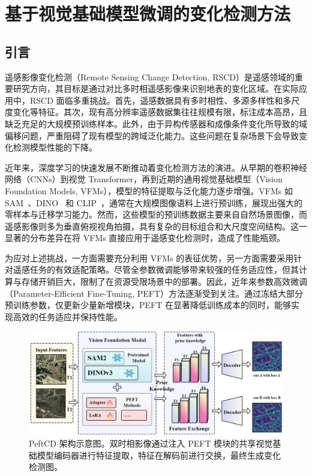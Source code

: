 \section{基于视觉基础模型微调的变化检测方法}

\subsection{引言}

遥感影像变化检测（Remote Sensing Change Detection, RSCD）是遥感领域的重要研究方向，其目标是通过对比多时相遥感影像来识别地表的变化区域。在实际应用中，RSCD 面临多重挑战。首先，遥感数据具有多时相性、多源多样性和多尺度变化等特征。其次，现有高分辨率遥感数据集往往规模有限，标注成本高昂，且缺乏充足的大规模预训练样本。此外，由于异构传感器和成像条件变化所导致的域偏移问题，严重阻碍了现有模型的跨域泛化能力。这些问题在复杂场景下会导致变化检测模型性能的下降。

近年来，深度学习的快速发展不断推动着变化检测方法的演进。从早期的卷积神经网络（CNNs）到视觉 Transformer，再到近期的通用视觉基础模型（Vision Foundation Models, VFMs），模型的特征提取与泛化能力逐步增强。VFMs 如 SAM~\cite{Kirillov2023SegmentA}、DINO~\cite{Caron2021EmergingPI,simeoni2025dinov3} 和 CLIP~\cite{Radford2021LearningTV}，通常在大规模图像语料上进行预训练，展现出强大的零样本与迁移学习能力。然而，这些模型的预训练数据主要来自自然场景图像，而遥感影像则多为垂直俯视视角拍摄，具有复杂的目标组合和大尺度空间结构。这一显著的分布差异在将 VFMs 直接应用于遥感变化检测时，造成了性能瓶颈。

为应对上述挑战，一方面需要充分利用 VFMs 的表征优势，另一方面需要采用针对遥感任务的有效适配策略。尽管全参数微调能够带来较强的任务适应性，但其计算与存储开销巨大，限制了在资源受限场景中的部署。因此，近年来参数高效微调（Parameter-Efficient Fine-Tuning, PEFT）方法逐渐受到关注。通过冻结大部分预训练参数，仅更新少量新增模块，PEFT 在显著降低训练成本的同时，能够实现高效的任务适应并保持性能。

\begin{figure}[!htbp]
  \centering
  \includegraphics[width=\textwidth]{paper_figures/基于AI基础模型微调的变化检测模型研究/PeftCD/peftcd_framework.png}
  \caption{PeftCD 架构示意图。双时相影像通过注入 PEFT 模块的共享视觉基础模型编码器进行特征提取，特征在解码前进行交换，最终生成变化检测图。}
  \label{fig:peftcd_framework}
\end{figure}

